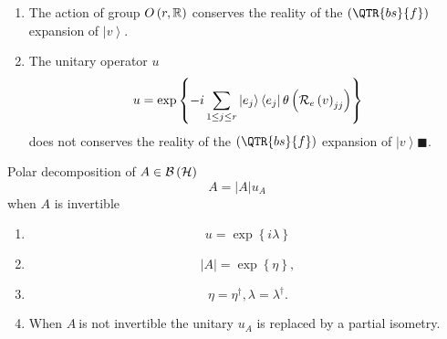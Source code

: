 \begin{enumerate}
\item The action of group $O\left( r,{\Bbb R}\right) $ conserves the reality
of the $\left( \QTR{bs}{f}\right) $ expansion of $\left\vert v\right\rangle
. $

\item The unitary operator $u$%
\begin{equation}
u=\exp \left\{ -i\sum_{1\leq j\leq r}\left\vert \stackrel{}{e_{j}}%
\right\rangle \left\langle \stackrel{}{e_{j}}\right\vert \theta \left( {\cal %
R}_{e}\left( v\right) _{jj}\right) \right\}
\end{equation}%
does not conserves the reality of the $\left( \QTR{bs}{f}\right) $ expansion
of $\left\vert v\right\rangle \blacksquare .$
\end{enumerate}

\begin{remark}
Polar decomposition of $A\in {\cal B}\left( {\cal H}\right) $%
\begin{equation}
A=\left\vert A\right\vert u_{A}
\end{equation}%
when $A$ is invertible

\begin{enumerate}
\item 
\begin{equation}
u=\exp \left\{ i\lambda \right\}
\end{equation}

\item 
\begin{equation}
\left\vert A\right\vert =\exp \left\{ \eta \right\} ,
\end{equation}

\item 
\begin{equation}
\eta =\eta ^{\dagger },\lambda =\lambda ^{\dagger }.
\end{equation}

\item When $A\ $is not invertible the unitary $u_{A}$ is replaced by a
partial isometry.
\end{enumerate}
\end{remark}

